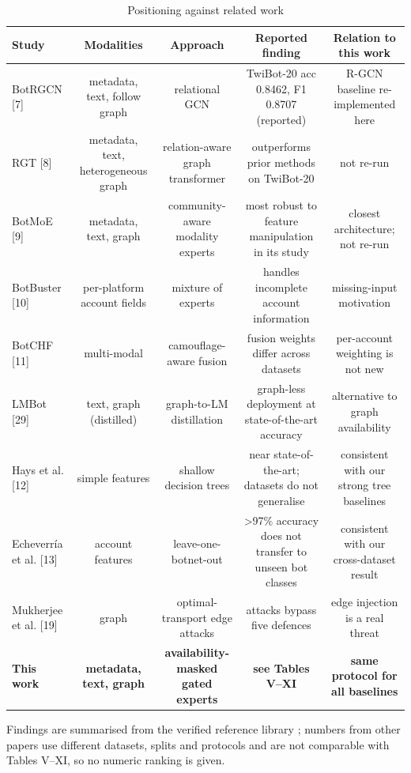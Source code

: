 \begin{table}[!t]
\caption{Positioning against related work}
\label{tab:related_work}
\centering\footnotesize
\setlength{\tabcolsep}{3pt}
\begin{tabular}{lcccc}
\hline
Study & Modalities & Approach & Reported finding & Relation to this work \\
\hline
BotRGCN [7] & metadata, text, follow graph & relational GCN & TwiBot-20 acc 0.8462, F1 0.8707 (reported) & R-GCN baseline re-implemented here \\
RGT [8] & metadata, text, heterogeneous graph & relation-aware graph transformer & outperforms prior methods on TwiBot-20 & not re-run \\
BotMoE [9] & metadata, text, graph & community-aware modality experts & most robust to feature manipulation in its study & closest architecture; not re-run \\
BotBuster [10] & per-platform account fields & mixture of experts & handles incomplete account information & missing-input motivation \\
BotCHF [11] & multi-modal & camouflage-aware fusion & fusion weights differ across datasets & per-account weighting is not new \\
LMBot [29] & text, graph (distilled) & graph-to-LM distillation & graph-less deployment at state-of-the-art accuracy & alternative to graph availability \\
Hays et al. [12] & simple features & shallow decision trees & near state-of-the-art; datasets do not generalise & consistent with our strong tree baselines \\
Echeverría et al. [13] & account features & leave-one-botnet-out & >97\% accuracy does not transfer to unseen bot classes & consistent with our cross-dataset result \\
Mukherjee et al. [19] & graph & optimal-transport edge attacks & attacks bypass five defences & edge injection is a real threat \\
\textbf{This work} & \textbf{metadata, text, graph} & \textbf{availability-masked gated experts} & \textbf{see Tables V--XI} & \textbf{same protocol for all baselines} \\
\hline
\end{tabular}
\par\smallskip\parbox{\linewidth}{\scriptsize Findings are summarised from the verified reference library ; numbers from other papers use different datasets, splits and protocols and are not comparable with Tables V--XI, so no numeric ranking is given.}
\end{table}
